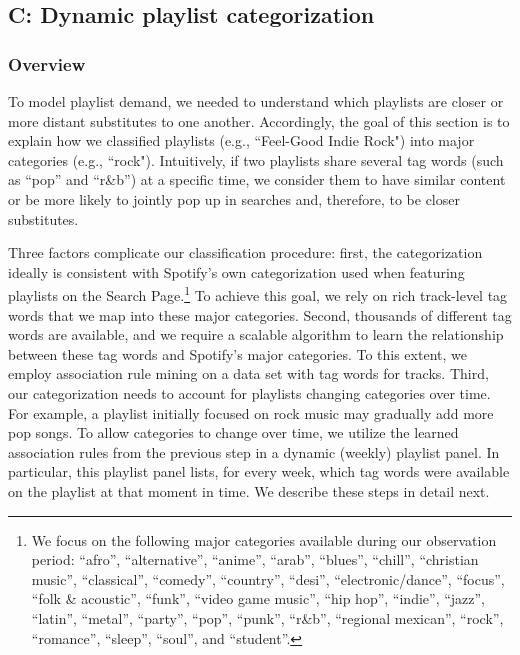 
\subsection*{C: Dynamic playlist categorization}
\label{details_mining}

\setcounter{figure}{0}

\setcounter{table}{0}

\setcounter{equation}{0}

\renewcommand\thefigure{C\arabic{figure}}
\renewcommand\thetable{C\arabic{table}}
\renewcommand\theequation{C\arabic{equation}}

\subsubsection*{Overview}

To model playlist demand, we needed to understand which playlists are closer or more distant substitutes to one another. Accordingly, the goal of this section is to explain how we classified playlists (e.g., ``Feel-Good Indie Rock") into major categories (e.g., ``rock"). Intuitively, if two playlists share several tag words (such as ``pop” and ``r\&b”) at a specific time, we consider them to have similar content or be more likely to jointly pop up in searches and, therefore, to be closer substitutes.

Three factors complicate our classification procedure: first, the categorization ideally is consistent with Spotify's own categorization used when featuring playlists on the Search Page.\footnote{We focus on the following major categories available during our observation period: {``afro'', ``alternative'', ``anime'',  ``arab'', ``blues'', ``chill'', ``christian music'',  ``classical'', ``comedy'', ``country'', ``desi'', ``electronic/dance'', ``focus'', ``folk} \&  {acoustic'', ``funk'', ``video game music'', ``hip hop'', ``indie'', ``jazz'', ``latin'', ``metal'', ``party'', ``pop'', ``punk'', ``r}\&{b'', ``regional mexican'', ``rock'', ``romance'', ``sleep'', ``soul'', and ``student''}.} To achieve this goal, we rely on rich track-level tag words that we map into these major categories.
Second, thousands of different tag words are available, and we require a scalable algorithm to learn the relationship between these tag words and Spotify's major categories. To this extent, we employ association rule mining \citep{hastie_09} on a data set with tag words for tracks. Third, our categorization needs to account for playlists changing categories over time. For example, a playlist initially focused on rock music may gradually add more pop songs. To allow categories to change over time, we utilize the learned association rules from the previous step in a dynamic (weekly) playlist panel. In particular, this playlist panel lists, for every week, which tag words were available on the playlist at that moment in time. We describe these steps in detail next.

